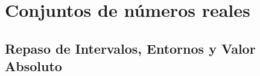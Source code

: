 %
%
%
%
%
%
%
%
%
%
%
%

\section{Conjuntos de números reales}
\subsection{Repaso de Intervalos, Entornos y Valor Absoluto}

